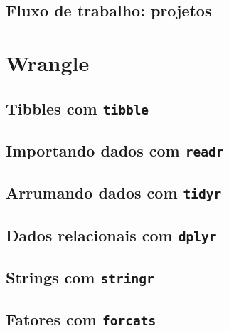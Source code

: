 \documentclass[
]{latex/krantz}
\theoremstyle{definition}
\theoremstyle{definition}
\theoremstyle{definition}
\theoremstyle{definition}
\theoremstyle{remark}
\begin{document}
\hypertarget{fluxo-de-trabalho-projetos}{%
\chapter{Fluxo de trabalho: projetos}\label{fluxo-de-trabalho-projetos}}

\hypertarget{part-wrangle}{%
\part{Wrangle}\label{part-wrangle}}

\hypertarget{tibbles-com-tibble}{%
\chapter{\texorpdfstring{Tibbles com \texttt{tibble}}{Tibbles com tibble}}\label{tibbles-com-tibble}}

\hypertarget{importando-dados-com-readr}{%
\chapter{\texorpdfstring{Importando dados com \texttt{readr}}{Importando dados com readr}}\label{importando-dados-com-readr}}

\hypertarget{arrumando-dados-com-tidyr}{%
\chapter{\texorpdfstring{Arrumando dados com \texttt{tidyr}}{Arrumando dados com tidyr}}\label{arrumando-dados-com-tidyr}}

\hypertarget{dados-relacionais-com-dplyr}{%
\chapter{\texorpdfstring{Dados relacionais com \texttt{dplyr}}{Dados relacionais com dplyr}}\label{dados-relacionais-com-dplyr}}

\hypertarget{strings-com-stringr}{%
\chapter{\texorpdfstring{Strings com \texttt{stringr}}{Strings com stringr}}\label{strings-com-stringr}}

\hypertarget{fatores-com-forcats}{%
\chapter{\texorpdfstring{Fatores com \texttt{forcats}}{Fatores com forcats}}\label{fatores-com-forcats}}
\end{document}
